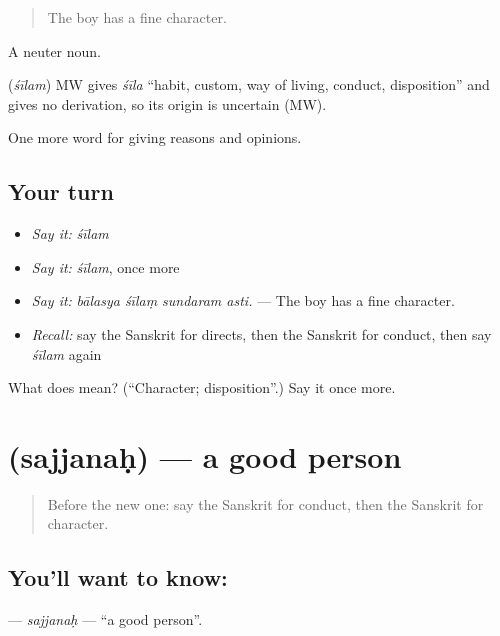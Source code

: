 \begin{quote}
The boy has a fine character.
\end{quote}

A neuter noun.

\begin{cousinweb}
\textbf{} (\emph{śīlam}) MW gives \emph{śīla} \textquotedblleft{}habit, custom, way of living, conduct, disposition\textquotedblright{} and gives no derivation, so its origin is uncertain (MW).
\end{cousinweb}

\begin{grammarlens}[title={What you've built}]
One more word for giving reasons and opinions.
\end{grammarlens}

\subsection*{Your turn}
\begin{itemize}
\raggedright
  \item \emph{Say it:} \emph{śīlam}
  \item \emph{Say it:} \emph{śīlam}, once more
  \item \emph{Say it:} \emph{bālasya śīlaṃ sundaram asti.} — The boy has a fine character.
  \item \emph{Recall:} say the Sanskrit for directs, then the Sanskrit for conduct, then say \emph{śīlam} again
\end{itemize}

\begin{tcolorbox}[breakable,colback=teal!4,colframe=teal!35!black,title={Before you move on}]
What does  mean? (\textquotedblleft{}Character; disposition\textquotedblright{}.) Say it once more.
\end{tcolorbox}
\section[\texorpdfstring{\sk{सज्जनः} (sajjanaḥ)}{सज्जनः (sajjanaḥ)}]{ (sajjanaḥ) — a good person}

\label{lesson:SA-C358-sajjanah}



\begin{quote}
Before the new one: say the Sanskrit for conduct, then the Sanskrit for character.
\end{quote}

\subsection*{You'll want to know: }
\textbf{} — \emph{sajjanaḥ} — \textquotedblleft{}a good person\textquotedblright{}.

